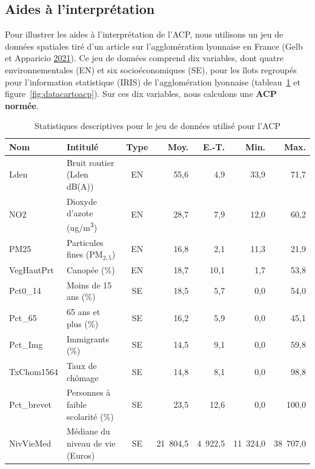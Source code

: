 \documentclass[
  11pt,
  french,
]{book}
\begin{document}
\hypertarget{sect1222}{%
\subsection{Aides à l'interprétation}\label{sect1222}}

Pour illustrer les aides à l'interprétation de l'ACP, nous utilisons un jeu de données spatiales tiré d'un article sur l'agglomération lyonnaise en France (Gelb et Apparicio \protect\hyperlink{ref-2021_4}{2021}). Ce jeu de données comprend dix variables, dont quatre environnementales (EN) et six socioéconomiques (SE), pour les îlots regroupés pour l'information statistique (IRIS) de l'agglomération lyonnaise (tableau~\ref{tab:dataacp} et figure~\ref{fig:datacartoacp}). Sur ces dix variables, nous calculons une \textbf{ACP normée}.

\begin{table}

\caption{\label{tab:dataacp}Statistiques descriptives pour le jeu de données utilisé pour l'ACP}
\centering
\fontsize{8}{10}\selectfont
\begin{tabular}[t]{llcrrrr}
\toprule
Nom & Intitulé & Type & Moy. & E.-T. & Min. & Max.\\
\midrule
Lden & Bruit routier (Lden dB(A)) & EN & 55,6 & 4,9 & 33,9 & 71,7\\
NO2 & Dioxyde d'azote (ug/m\textsuperscript{3}) & EN & 28,7 & 7,9 & 12,0 & 60,2\\
PM25 & Particules fines (PM$_{2,5}$) & EN & 16,8 & 2,1 & 11,3 & 21,9\\
VegHautPrt & Canopée (\%) & EN & 18,7 & 10,1 & 1,7 & 53,8\\
Pct0\_14 & Moins de 15 ans (\%) & SE & 18,5 & 5,7 & 0,0 & 54,0\\
\addlinespace
Pct\_65 & 65 ans et plus (\%) & SE & 16,2 & 5,9 & 0,0 & 45,1\\
Pct\_Img & Immigrants (\%) & SE & 14,5 & 9,1 & 0,0 & 59,8\\
TxChom1564 & Taux de chômage & SE & 14,8 & 8,1 & 0,0 & 98,8\\
Pct\_brevet & Personnes à faible scolarité (\%) & SE & 23,5 & 12,6 & 0,0 & 100,0\\
NivVieMed & Médiane du niveau de vie (Euros) & SE & 21 804,5 & 4 922,5 & 11 324,0 & 38 707,0\\
\bottomrule
\end{tabular}
\end{table}
\end{document}
